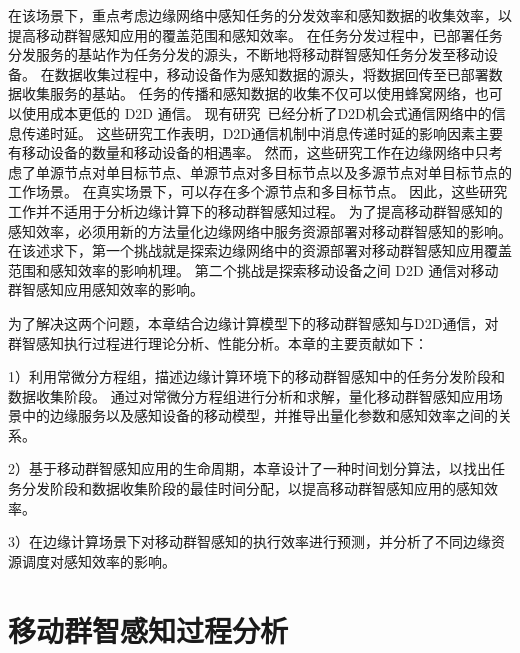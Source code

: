 在该场景下，重点考虑边缘网络中感知任务的分发效率和感知数据的收集效率，以提高移动群智感知应用的覆盖范围和感知效率。
在任务分发过程中，已部署任务分发服务的基站作为任务分发的源头，不断地将移动群智感知任务分发至移动设备。
在数据收集过程中，移动设备作为感知数据的源头，将数据回传至已部署数据收集服务的基站。
任务的传播和感知数据的收集不仅可以使用蜂窝网络，也可以使用成本更低的 D2D 通信。
现有研究~\cite{DBLP:conf/wcnc/QinF13,DBLP:journals/twc/LiW14,DBLP:journals/winet/ZhaoMLT18}已经分析了D2D机会式通信网络中的信息传递时延。
这些研究工作表明，D2D通信机制中消息传递时延的影响因素主要有移动设备的数量和移动设备的相遇率。
然而，这些研究工作在边缘网络中只考虑了单源节点对单目标节点、单源节点对多目标节点以及多源节点对单目标节点的工作场景。
在真实场景下，可以存在多个源节点和多目标节点。
因此，这些研究工作并不适用于分析边缘计算下的移动群智感知过程。
为了提高移动群智感知的感知效率，必须用新的方法量化边缘网络中服务资源部署对移动群智感知的影响。
在该述求下，第一个挑战就是探索边缘网络中的资源部署对移动群智感知应用覆盖范围和感知效率的影响机理。
第二个挑战是探索移动设备之间 D2D 通信对移动群智感知应用感知效率的影响。

为了解决这两个问题，本章结合边缘计算模型下的移动群智感知与D2D通信，对群智感知执行过程进行理论分析、性能分析。本章的主要贡献如下：

1）利用常微分方程组，描述边缘计算环境下的移动群智感知中的任务分发阶段和数据收集阶段。
通过对常微分方程组进行分析和求解，量化移动群智感知应用场景中的边缘服务以及感知设备的移动模型，并推导出量化参数和感知效率之间的关系。


2）基于移动群智感知应用的生命周期，本章设计了一种时间划分算法，以找出任务分发阶段和数据收集阶段的最佳时间分配，以提高移动群智感知应用的感知效率。

3）在边缘计算场景下对移动群智感知的执行效率进行预测，并分析了不同边缘资源调度对感知效率的影响。


\section{移动群智感知过程分析}


